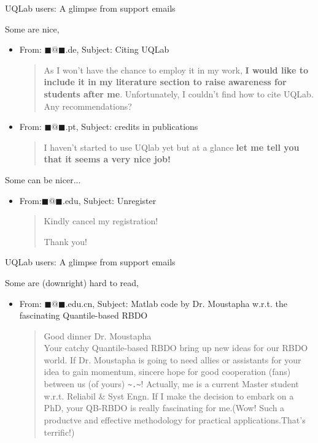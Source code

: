 \documentclass[]{rsuqbeamernew}
\begin{document}
\begin{frame}{UQLab users: A glimpse from support emails}

Some are nice,
\begin{itemize}
  \item From: $\blacksquare@\blacksquare$.de, Subject: Citing UQLab
  \begin{quotation}
    As I won't have the chance to employ it in my work, \textbf{I would like to include it in my literature section to raise awareness for students after me}.
    Unfortunately, I couldn't find how to cite UQLab. Any recommendations?
  \end{quotation}
  \item From: $\blacksquare@\blacksquare$.pt, Subject: credits in publications
  \begin{quotation}
    I haven't started to use UQlab yet but at a glance \textbf{let me tell you that it seems a very nice job!}
  \end{quotation}
\end{itemize}

Some can be nicer...
\begin{itemize}
  \item From:$\blacksquare@\blacksquare$.edu, Subject: Unregister
  \begin{quotation}
    Kindly cancel my registration!
    
    Thank you!
  \end{quotation}
\end{itemize}

\end{frame}

\begin{frame}{UQLab users: A glimpse from support emails}

Some are (downright) hard to read,
\begin{itemize}
  \item From: $\blacksquare@\blacksquare$.edu.cn, Subject: Matlab code by Dr. Moustapha w.r.t. the fascinating Quantile-based RBDO
  \begin{quotation}
    Good dinner Dr. Moustapha \\
    Your catchy Quantile-based RBDO bring up new ideas for our RBDO world.
    If Dr. Moustapha is going to need allies or assistants for your idea to gain momentum, sincere hope for good cooperation (fans) between us (of yours) \texttt{\textasciitilde.\textasciitilde}!
    Actually, me is a current Master student w.r.t. Reliabil \& Syst Engn.
    If I make the decision to embark on a PhD, your QB-RBDO is really fascinating for me.(Wow! Such a productve and effective methodology for practical applications.That's terrific!)
  \end{quotation}
\end{itemize}

\end{frame}
\end{document}

